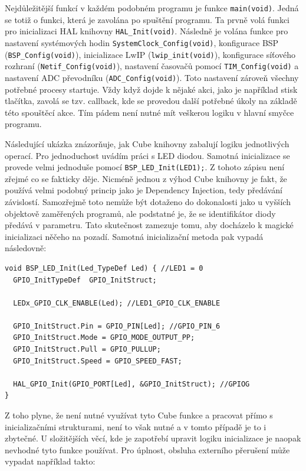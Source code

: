 Nejdůležitější funkcí v každém podobném programu je funkce \texttt{main(void)}. Jedná se totiž o funkci, která je zavolána po spuštění programu. Ta prvně volá funkci pro inicializaci HAL knihovny \texttt{HAL\_Init(void)}. Následně je volána funkce pro nastavení systémových hodin \texttt{SystemClock\_Config(void)}, konfigurace BSP (\texttt{BSP\_Config(void)}), inicializace LwIP (\texttt{lwip\_init(void)}), konfigurace síťového rozhraní (\texttt{Netif\_Config(void)}), nastavení časovačů pomocí \texttt{TIM\_Config(void)} a nastavení ADC převodníku (\texttt{ADC\_Config(void)}). Toto nastavení zároveň všechny potřebné procesy startuje. Vždy když dojde k nějaké akci, jako je například stisk tlačítka, zavolá se tzv. callback, kde se provedou další potřebné úkoly na základě této spouštěcí akce. Tím pádem není nutné mít veškerou logiku v hlavní smyčce programu.

Následující ukázka znázorňuje, jak Cube knihovny zabalují logiku jednotlivých operací. Pro jednoduchost uvádím práci s LED diodou. Samotná inicializace se provede velmi jednoduše pomocí \texttt{BSP\_LED\_Init(LED1);}. Z tohoto zápisu není zřejmé co se fakticky děje. Nicméně jednou z výhod Cube knihovny je fakt, že používá velmi podobný princip jako je Dependency Injection, tedy předávání závislostí. Samozřejmě toto nemůže být dotaženo do dokonalosti jako u vyšších objektově zaměřených programů, ale podstatné je, že se identifikátor diody předává v parametru. Tato skutečnost zamezuje tomu, aby docházelo k magické inicializaci něčeho na pozadí. Samotná inicializační metoda pak vypadá následovně:

\begin{verbatim}
void BSP_LED_Init(Led_TypeDef Led) { //LED1 = 0
  GPIO_InitTypeDef  GPIO_InitStruct;

  LEDx_GPIO_CLK_ENABLE(Led); //LED1_GPIO_CLK_ENABLE

  GPIO_InitStruct.Pin = GPIO_PIN[Led]; //GPIO_PIN_6
  GPIO_InitStruct.Mode = GPIO_MODE_OUTPUT_PP;
  GPIO_InitStruct.Pull = GPIO_PULLUP;
  GPIO_InitStruct.Speed = GPIO_SPEED_FAST;
  
  HAL_GPIO_Init(GPIO_PORT[Led], &GPIO_InitStruct); //GPIOG
}
\end{verbatim}

Z toho plyne, že není nutné využívat tyto Cube funkce a pracovat přímo s inicializačními strukturami, není to však nutné a v tomto případě je to i zbytečné. U složitějších věcí, kde je zapotřebí upravit logiku inicializace je naopak nevhodné tyto funkce používat. Pro úplnost, obsluha externího přerušení může vypadat například takto:

